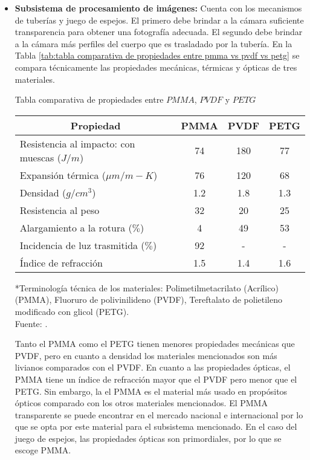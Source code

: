 \begin{itemize}
	\item \textbf{Subsistema de procesamiento de imágenes:} Cuenta con los mecanismos de tuberías y juego de espejos. El primero debe brindar a la cámara suficiente transparencia para obtener una fotografía adecuada. El segundo debe brindar a la cámara más perfiles del cuerpo que es trasladado por la tubería. En la Tabla \ref{tab:tabla comparativa de propiedades entre pmma vs pvdf vs petg} se compara técnicamente las propiedades mecánicas, térmicas y ópticas de tres materiales.
	
	\begin{mytable}[H]
		\footnotesize\centering
		\caption{Tabla comparativa de propiedades entre $PMMA$, $PVDF$ y $PETG$}
		\label{tab:tabla comparativa de propiedades entre pmma vs pvdf vs petg}
		\begin{tabular}{|l|c|c|c|}
			\hline
			\multicolumn{1}{|c|}{\textbf{Propiedad}} & \multicolumn{1}{c|}{\textbf{PMMA}} & \textbf{PVDF}& \textbf{PETG} \\ \hline
			Resistencia al impacto: con muescas ($J/m$) & 74 & 180 & 77  \\ \hline
			Expansión térmica (${\mu}m/m-K$)  & 76 & 120 & 68 \\ \hline
			Densidad ($g/cm^3$) & 1.2 & 1.8  & 1.3 \\ \hline
			Resistencia al peso  & 32 & 20 & 25 \\ \hline
			Alargamiento a la rotura ($ \% $) & 4 & 49 & 53 \\ \hline
			Incidencia de luz trasmitida ($ \% $) & 92 & - & - \\ \hline
			Índice de refracción & 1.5 & 1.4 & 1.6\\ \hline			
		\end{tabular}
		\begin{myflushcenteraftertable}
			*Terminología técnica de los materiales: Polimetilmetacrilato (Acrílico)(PMMA), Fluoruro de polivinilideno (PVDF), Tereftalato de polietileno modificado con glicol (PETG).\\		
			Fuente: \cite{Brydson1999,Berins1991,Harper2000,MakeItFrom2020}.
		\end{myflushcenteraftertable}
	\end{mytable}

	Tanto el PMMA como el PETG tienen menores propiedades mecánicas que PVDF, pero en cuanto a densidad los materiales mencionados son más livianos comparados con el PVDF. En cuanto a las propiedades ópticas, el PMMA tiene un índice de refracción mayor que el PVDF pero menor que el PETG. Sin embargo, la el PMMA es el material más usado en propósitos ópticos comparado con los otros materiales mencionados. El PMMA transparente se puede encontrar en el mercado nacional e internacional por lo que se opta por este material para el subsistema mencionado. En el caso del juego de espejos, las propiedades ópticas son primordiales, por lo que se escoge PMMA.
	

\end{itemize}
